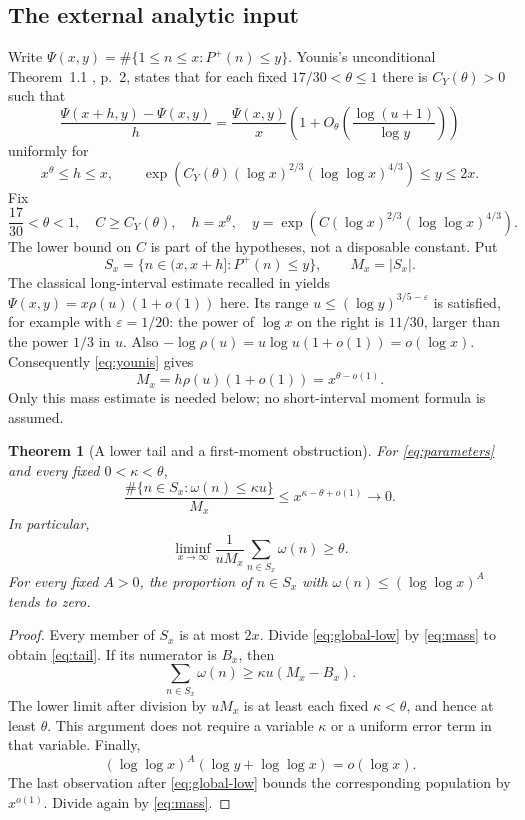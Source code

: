 \documentclass[11pt]{amsart}
\newtheorem{theorem}{Theorem}[section]
\theoremstyle{definition}
\theoremstyle{remark}
\newcommand{\eps}{\varepsilon}
\newcommand{\loglog}{\log\log}
\begin{document}
\subsection{The external analytic input}
Write $\Psi(x,y)=\#\{1\le n\le x:P^+(n)\le y\}$.
Younis's unconditional Theorem~1.1 \cite{Younis}, p.~2, states that for
each fixed $17/30<\theta\le1$ there is $C_Y(\theta)>0$ such that
\begin{equation}\label{eq:younis}
 \frac{\Psi(x+h,y)-\Psi(x,y)}h
 =\frac{\Psi(x,y)}x
  \left(1+O_\theta\left(\frac{\log(u+1)}{\log y}\right)\right)
\end{equation}
uniformly for
\[
 x^\theta\le h\le x,\qquad
 \exp\!\left(C_Y(\theta)(\log x)^{2/3}(\loglog x)^{4/3}\right)
 \le y\le2x.
\]
Fix
\begin{equation}\label{eq:parameters}
 \frac{17}{30}<\theta<1,\quad C\ge C_Y(\theta),\quad
 h=x^\theta,\quad
 y=\exp\!\left(C(\log x)^{2/3}(\loglog x)^{4/3}\right).
\end{equation}
The lower bound on $C$ is part of the hypotheses, not a disposable constant.
Put
\[
 S_x=\{n\in(x,x+h]:P^+(n)\le y\},\qquad M_x=|S_x|.
\]
The classical long-interval estimate recalled in
\cite[equations (1.8)--(1.9), p.~415]{HT} yields
$\Psi(x,y)=x\rho(u)(1+o(1))$ here. Its range
$u\le(\log y)^{3/5-\eps}$ is satisfied, for example with $\eps=1/20$:
the power of $\log x$ on the right is $11/30$, larger than the power
$1/3$ in $u$.
Also $-\log\rho(u)=u\log u(1+o(1))=o(\log x)$.
Consequently \eqref{eq:younis} gives
\begin{equation}\label{eq:mass}
 M_x=h\rho(u)(1+o(1))=x^{\theta-o(1)}.
\end{equation}
Only this mass estimate is needed below; no short-interval moment formula
is assumed.

\begin{theorem}[A lower tail and a first-moment obstruction]\label{thm:tail}
For \eqref{eq:parameters} and every fixed $0<\kappa<\theta$,
\begin{equation}\label{eq:tail}
 \frac{\#\{n\in S_x:\omega(n)\le\kappa u\}}{M_x}
 \le x^{\kappa-\theta+o(1)}\longrightarrow0.
\end{equation}
In particular,
\begin{equation}\label{eq:mean}
 \liminf_{x\to\infty}\frac1{uM_x}
          \sum_{n\in S_x}\omega(n)\ge\theta.
\end{equation}
For every fixed $A>0$, the proportion of $n\in S_x$ with
$\omega(n)\le(\loglog x)^A$ tends to zero.
\end{theorem}
\begin{proof}
Every member of $S_x$ is at most $2x$. Divide \eqref{eq:global-low} by
\eqref{eq:mass} to obtain \eqref{eq:tail}. If its numerator is $B_x$, then
\[
 \sum_{n\in S_x}\omega(n)\ge\kappa u(M_x-B_x).
\]
The lower limit after division by $uM_x$ is at least each fixed
$\kappa<\theta$, and hence at least $\theta$. This argument does not
require a variable $\kappa$ or a uniform error term in that variable.
Finally,
\[
 (\loglog x)^A(\log y+\loglog x)=o(\log x).
\]
The last observation after \eqref{eq:global-low} bounds the corresponding
population by $x^{o(1)}$. Divide again by \eqref{eq:mass}.
\end{proof}
\end{document}
